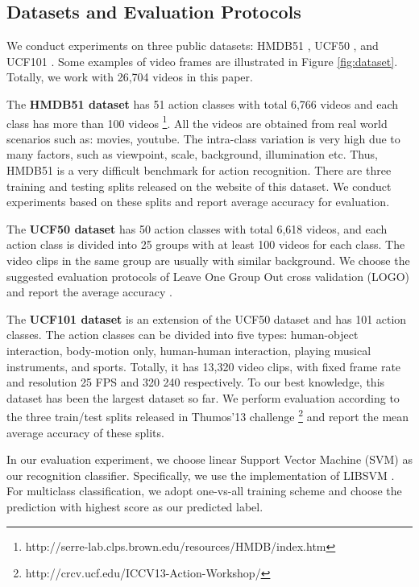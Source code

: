 \documentclass[twocolumn]{svjour3}          \smartqed  \usepackage{slashbox}
\begin{document}
\subsection{Datasets and Evaluation Protocols}
We conduct experiments on three public datasets: HMDB51 \cite{KuehneJGPS11}, UCF50 \cite{ReddyS13}, and UCF101 \cite{SOOMRO12}. Some examples of video frames are illustrated in Figure \ref{fig:dataset}. Totally, we work with 26,704 videos in this paper.

The \textbf{HMDB51 dataset} has 51 action classes with total 6,766 videos and each class has more than 100 videos \footnote{http://serre-lab.clps.brown.edu/resources/HMDB/index.htm}. All the videos are obtained from real world scenarios such as: movies, youtube. The intra-class variation is very high due to many factors, such as viewpoint, scale, background, illumination etc. Thus, HMDB51 is a very difficult benchmark for action recognition. There are three training and testing splits released on the website of this dataset. We conduct experiments based on these splits and report average accuracy for evaluation.

The \textbf{UCF50 dataset} has 50 action classes with total 6,618 videos, and each action class is divided into 25 groups with at least 100 videos for each class. The video clips in the same group are usually with similar background. We choose the suggested evaluation protocols of Leave One Group Out cross validation (LOGO) and report the average accuracy \cite{ReddyS13}.

The \textbf{UCF101 dataset} is an extension of the UCF50 dataset and has 101 action classes. The action classes can be divided into five types: human-object interaction, body-motion only, human-human interaction, playing musical instruments, and sports. Totally, it has 13,320 video clips, with fixed frame rate and resolution 25 FPS and 320  240 respectively. To our best knowledge, this dataset has been the largest dataset so far. We perform evaluation according to the three train/test splits released in Thumos'13 challenge \footnote{http://crcv.ucf.edu/ICCV13-Action-Workshop/} and report the mean average accuracy of these splits.

In our evaluation experiment, we choose linear Support Vector Machine (SVM) as our recognition classifier. Specifically, we use the implementation of LIBSVM \cite{ChangL11}. For multiclass classification, we adopt one-vs-all training scheme and choose the prediction with highest score as our predicted label.
\end{document}
